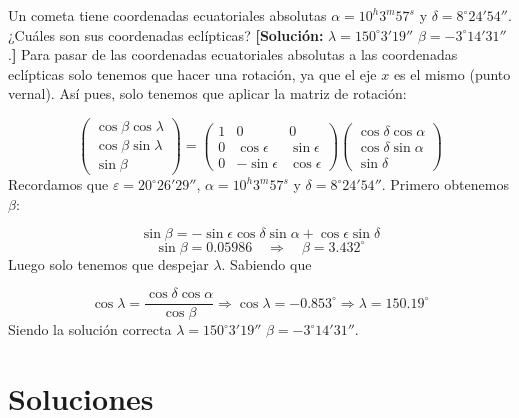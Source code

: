 \begin{texercise}
	Un cometa tiene coordenadas ecuatoriales absolutas $\alpha = 10^{h}3^{m}57^{s}$ y $\delta = 8^\circ24'54''$. ¿Cuáles son sus coordenadas eclípticas?  
	\textbf{[Solución:} $\lambda = 150^\circ3'19''$	$\beta = -3^\circ14'31''$.\textbf{]}
	\tcblower
	Para pasar de las coordenadas ecuatoriales absolutas a las coordenadas eclípticas solo tenemos que hacer una rotación, ya que el eje $x$ es el mismo (punto vernal). Así pues, solo tenemos que aplicar la matriz de rotación: 

	\begin{equation}
		\begin{pmatrix}
			\cos \beta \cos \lambda \\
			\cos \beta \sin \lambda \\
			\sin \beta
		\end{pmatrix} =\begin{pmatrix}
			1 & 0 & 0 \\
			0 & \cos \epsilon & \sin \epsilon \\
			0 & -\sin \epsilon &  \cos \epsilon
		\end{pmatrix}
		\begin{pmatrix}
			\cos \delta \cos \alpha \\
			\cos \delta \sin \alpha \\
			\sin \delta
		\end{pmatrix}
	\end{equation}
	Recordamos que $\varepsilon=20^\circ 26' 29''$, $\alpha = 10^{h}3^{m}57^{s}$ y $\delta = 8^\circ24'54''$. Primero obtenemos $\beta$:

	\begin{equation}
		\sin \beta = - \sin \epsilon \cos \delta \sin \alpha + \cos \epsilon \sin \delta 
	\end{equation}
	\begin{equation}
		\sin \beta = 0.05986\quad \Longrightarrow \quad \beta = 3.432^\circ
	\end{equation}
	Luego solo tenemos que despejar $\lambda$. Sabiendo que 

	\begin{equation}
		\cos \lambda = \frac{\cos \delta \cos \alpha}{\cos \beta} \Rightarrow \cos \lambda = -0.853^\circ \Rightarrow \lambda = 150.19^\circ
	\end{equation}
	Siendo la solución correcta $\lambda = 150^\circ3'19''$	$\beta = -3^\circ14'31''$.
\end{texercise}

\tcbstoprecording

\section{Soluciones}
\tcbinputrecords
